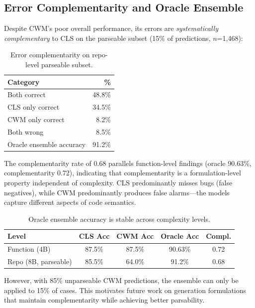 \documentclass[11pt]{article}
\begin{document}
\subsection{Error Complementarity and Oracle Ensemble}
\label{sec:complementarity}

Despite CWM's poor overall performance, its errors are \emph{systematically complementary} to CLS on the parseable subset (15\% of predictions, $n$=1,468):

\begin{table}[h]
\centering
\caption{Error complementarity on repo-level parseable subset.}
\label{tab:complementarity}
\begin{tabular}{lr}
\toprule
Category & \% \\
\midrule
Both correct & 48.8\% \\
CLS only correct & 34.5\% \\
CWM only correct & 8.2\% \\
Both wrong & 8.5\% \\
\midrule
Oracle ensemble accuracy & 91.2\% \\
\bottomrule
\end{tabular}
\end{table}

The complementarity rate of 0.68 parallels function-level findings (oracle 90.63\%, complementarity 0.72), indicating that complementarity is a formulation-level property independent of complexity. CLS predominantly misses bugs (false negatives), while CWM predominantly produces false alarms---the models capture different aspects of code semantics.

\begin{table}[h]
\centering
\caption{Oracle ensemble accuracy is stable across complexity levels.}
\label{tab:oracle-levels}
\begin{tabular}{lcccc}
\toprule
Level & CLS Acc & CWM Acc & Oracle Acc & Compl. \\
\midrule
Function (4B) & 87.5\% & 87.5\% & 90.63\% & 0.72 \\
Repo (8B, parseable) & 85.5\% & 64.0\% & 91.2\% & 0.68 \\
\bottomrule
\end{tabular}
\end{table}

However, with 85\% unparseable CWM predictions, the ensemble can only be applied to 15\% of cases. This motivates future work on generation formulations that maintain complementarity while achieving better parsability.
\end{document}
